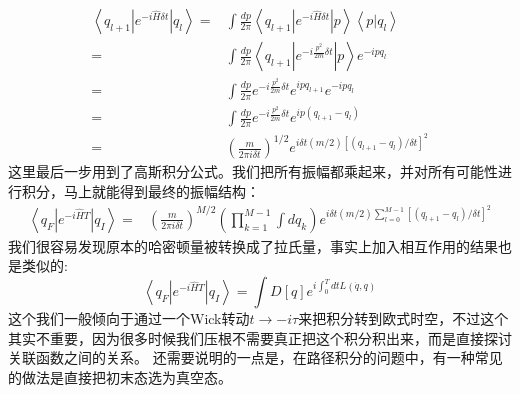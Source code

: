 \documentclass[12pt, a4paper, oneside]{ctexart}
\begin{document}
\begin{align} 
\left< q_{l+1}| e^{-i\hat H\delta t} | q_{l} \right>=&\int \frac{dp}{2\pi}\left< q_{l+1}| e^{-i\hat H\delta t} | p \right>\left< p| q_l \right>\nonumber\\ 
=&\int \frac{dp}{2\pi}\left< q_{l+1}| e^{-i\frac{p^2}{2m}\delta t} | p \right>e^{-ipq_l}\nonumber\\ 
=&\int \frac{dp}{2\pi}e^{-i\frac{p^2}{2m}\delta t}e^{ipq_{l+1}}e^{-ipq_l}\nonumber\\ 
=&\int \frac{dp}{2\pi}e^{-i\frac{p^2}{2m}\delta t}e^{ip(q_{l+1}-q_l)}\nonumber\\ 
=&(\frac{m}{2\pi i\delta t})^{1/2}e^{i\delta t(m/2)[(q_{l+1}-q_l)/\delta t]^2} \label{eq:qmintegral}
\end{align}
这里最后一步用到了高斯积分公式。我们把所有振幅都乘起来，并对所有可能性进行积分，马上就能得到最终的振幅结构：
\begin{align} 
\left< q_F | e^{-i\hat HT} | q_I \right>=&(\frac{m}{2\pi i\delta t})^{M/2}(\prod_{k=1}^{M-1}\int dq_k) e^{i\delta t(m/2)\sum_{l=0}^{M-1}[(q_{l+1}-q_l)/\delta t]^2} 
\end{align}
我们很容易发现原本的哈密顿量被转换成了拉氏量，事实上加入相互作用的结果也是类似的:
\begin{equation}
    \left< q_F | e^{-i\hat HT} | q_I \right>=\int D[q]e^{i\int_0^T dt L(\dot q,q)}
\end{equation}
这个我们一般倾向于通过一个Wick转动$t\rightarrow -i\tau$来把积分转到欧式时空，不过这个其实不重要，因为很多时候我们压根不需要真正把这个积分积出来，而是直接探讨关联函数之间的关系。
还需要说明的一点是，在路径积分的问题中，有一种常见的做法是直接把初末态选为真空态。
\end{document}
